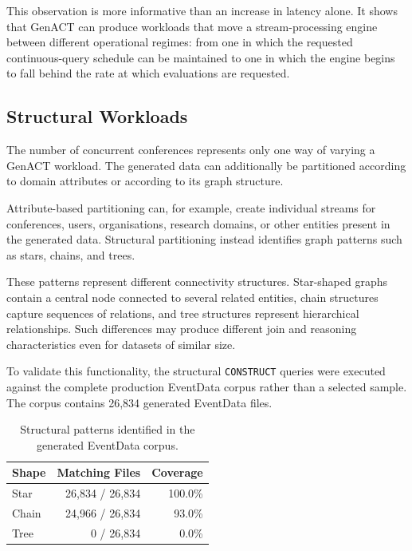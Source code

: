 This observation is more informative than an increase in latency alone. It
shows that GenACT can produce workloads that move a stream-processing engine
between different operational regimes: from one in which the requested
continuous-query schedule can be maintained to one in which the engine begins
to fall behind the rate at which evaluations are requested.


\subsection{Structural Workloads}
\label{subsec:genact-structural-workloads}

The number of concurrent conferences represents only one way of varying a
GenACT workload. The generated data can additionally be partitioned according
to domain attributes or according to its graph structure.

Attribute-based partitioning can, for example, create individual streams for
conferences, users, organisations, research domains, or other entities present
in the generated data. Structural partitioning instead identifies graph
patterns such as stars, chains, and trees.

These patterns represent different connectivity structures. Star-shaped graphs
contain a central node connected to several related entities, chain structures
capture sequences of relations, and tree structures represent hierarchical
relationships. Such differences may produce different join and reasoning
characteristics even for datasets of similar size.

To validate this functionality, the structural \texttt{CONSTRUCT} queries were
executed against the complete production EventData corpus rather than a
selected sample. The corpus contains 26,834 generated EventData files.

\begin{table}[htbp]
    \centering
    \caption{Structural patterns identified in the generated EventData corpus.}
    \label{tab:genact-shapes}
    \begin{tabular}{lrr}
        \toprule
        \textbf{Shape} &
        \textbf{Matching Files} &
        \textbf{Coverage} \\
        \midrule
        Star  & 26{,}834 / 26{,}834 & 100.0\% \\
        Chain & 24{,}966 / 26{,}834 & 93.0\% \\
        Tree  & 0 / 26{,}834 & 0.0\% \\
        \bottomrule
    \end{tabular}
\end{table}

